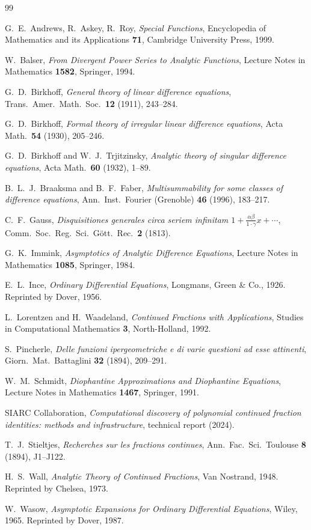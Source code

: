 \documentclass[11pt,a4paper]{article}
\theoremstyle{definition}
\begin{document}
\begin{thebibliography}{99}

 G.~E.~Andrews, R.~Askey, R.~Roy, \emph{Special Functions}, Encyclopedia of Mathematics and its Applications \textbf{71}, Cambridge University Press, 1999.

 W.~Balser, \emph{From Divergent Power Series to Analytic Functions}, Lecture Notes in Mathematics \textbf{1582}, Springer, 1994.

 G.~D.~Birkhoff, \emph{General theory of linear difference equations}, Trans.\ Amer.\ Math.\ Soc.\ \textbf{12} (1911), 243--284.

 G.~D.~Birkhoff, \emph{Formal theory of irregular linear difference equations}, Acta Math.\ \textbf{54} (1930), 205--246.

 G.~D.~Birkhoff and W.~J.~Trjitzinsky, \emph{Analytic theory of singular difference equations}, Acta Math.\ \textbf{60} (1932), 1--89.

 B.~L.~J.~Braaksma and B.~F.~Faber, \emph{Multisummability for some classes of difference equations}, Ann.\ Inst.\ Fourier (Grenoble) \textbf{46} (1996), 183--217.

 C.~F.~Gauss, \emph{Disquisitiones generales circa seriem infinitam $1 + \tfrac{\alpha\beta}{1\cdot\gamma}x + \cdots$}, Comm.\ Soc.\ Reg.\ Sci.\ G\"ott.\ Rec.\ \textbf{2} (1813).

 G.~K.~Immink, \emph{Asymptotics of Analytic Difference Equations}, Lecture Notes in Mathematics \textbf{1085}, Springer, 1984.

 E.~L.~Ince, \emph{Ordinary Differential Equations}, Longmans, Green \& Co., 1926. Reprinted by Dover, 1956.

 L.~Lorentzen and H.~Waadeland, \emph{Continued Fractions with Applications}, Studies in Computational Mathematics \textbf{3}, North-Holland, 1992.

 S.~Pincherle, \emph{Delle funzioni ipergeometriche e di varie questioni ad esse attinenti}, Giorn.\ Mat.\ Battaglini \textbf{32} (1894), 209--291.

 W.~M.~Schmidt, \emph{Diophantine Approximations and Diophantine Equations}, Lecture Notes in Mathematics \textbf{1467}, Springer, 1991.

 SIARC Collaboration, \emph{Computational discovery of polynomial continued fraction identities: methods and infrastructure}, technical report (2024).

 T.~J.~Stieltjes, \emph{Recherches sur les fractions continues}, Ann.\ Fac.\ Sci.\ Toulouse \textbf{8} (1894), J1--J122.

 H.~S.~Wall, \emph{Analytic Theory of Continued Fractions}, Van Nostrand, 1948. Reprinted by Chelsea, 1973.

 W.~Wasow, \emph{Asymptotic Expansions for Ordinary Differential Equations}, Wiley, 1965. Reprinted by Dover, 1987.

\end{thebibliography}
\end{document}
